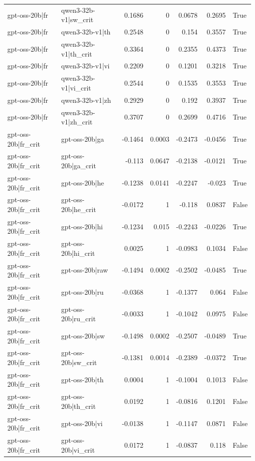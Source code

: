 \begin{table}
\begin{tabular}{l l r r r r l}
gpt-oss-20b|fr & qwen3-32b-v1|sw_crit & 0.1686 & 0 & 0.0678 & 0.2695 & True \\
gpt-oss-20b|fr & qwen3-32b-v1|th & 0.2548 & 0 & 0.154 & 0.3557 & True \\
gpt-oss-20b|fr & qwen3-32b-v1|th_crit & 0.3364 & 0 & 0.2355 & 0.4373 & True \\
gpt-oss-20b|fr & qwen3-32b-v1|vi & 0.2209 & 0 & 0.1201 & 0.3218 & True \\
gpt-oss-20b|fr & qwen3-32b-v1|vi_crit & 0.2544 & 0 & 0.1535 & 0.3553 & True \\
gpt-oss-20b|fr & qwen3-32b-v1|zh & 0.2929 & 0 & 0.192 & 0.3937 & True \\
gpt-oss-20b|fr & qwen3-32b-v1|zh_crit & 0.3707 & 0 & 0.2699 & 0.4716 & True \\
gpt-oss-20b|fr_crit & gpt-oss-20b|ga & -0.1464 & 0.0003 & -0.2473 & -0.0456 & True \\
gpt-oss-20b|fr_crit & gpt-oss-20b|ga_crit & -0.113 & 0.0647 & -0.2138 & -0.0121 & True \\
gpt-oss-20b|fr_crit & gpt-oss-20b|he & -0.1238 & 0.0141 & -0.2247 & -0.023 & True \\
gpt-oss-20b|fr_crit & gpt-oss-20b|he_crit & -0.0172 & 1 & -0.118 & 0.0837 & False \\
gpt-oss-20b|fr_crit & gpt-oss-20b|hi & -0.1234 & 0.015 & -0.2243 & -0.0226 & True \\
gpt-oss-20b|fr_crit & gpt-oss-20b|hi_crit & 0.0025 & 1 & -0.0983 & 0.1034 & False \\
gpt-oss-20b|fr_crit & gpt-oss-20b|raw & -0.1494 & 0.0002 & -0.2502 & -0.0485 & True \\
gpt-oss-20b|fr_crit & gpt-oss-20b|ru & -0.0368 & 1 & -0.1377 & 0.064 & False \\
gpt-oss-20b|fr_crit & gpt-oss-20b|ru_crit & -0.0033 & 1 & -0.1042 & 0.0975 & False \\
gpt-oss-20b|fr_crit & gpt-oss-20b|sw & -0.1498 & 0.0002 & -0.2507 & -0.0489 & True \\
gpt-oss-20b|fr_crit & gpt-oss-20b|sw_crit & -0.1381 & 0.0014 & -0.2389 & -0.0372 & True \\
gpt-oss-20b|fr_crit & gpt-oss-20b|th & 0.0004 & 1 & -0.1004 & 0.1013 & False \\
gpt-oss-20b|fr_crit & gpt-oss-20b|th_crit & 0.0192 & 1 & -0.0816 & 0.1201 & False \\
gpt-oss-20b|fr_crit & gpt-oss-20b|vi & -0.0138 & 1 & -0.1147 & 0.0871 & False \\
gpt-oss-20b|fr_crit & gpt-oss-20b|vi_crit & 0.0172 & 1 & -0.0837 & 0.118 & False \\

\end{tabular}
\end{table}
